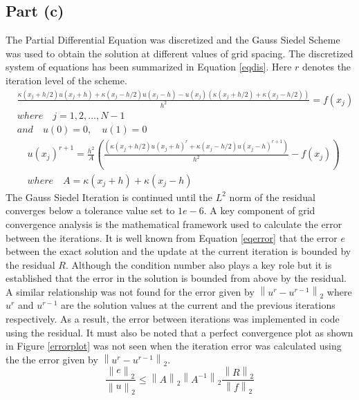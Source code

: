 \documentclass[12pt]{article}
\newcommand\norm[1]{\left\lVert#1\right\rVert}
\begin{document}
\subsection{Part (c)}
The Partial Differential Equation was discretized and the Gauss Siedel Scheme was used to obtain the solution at different values of grid spacing. The discretized system of equations has been summarized in Equation \ref{eqdis}. Here $r$ denotes the iteration level of the scheme.
\begin{equation} \label{eqdis}
    \begin{aligned}
        & \frac{\kappa( x_j + h/2 ) u(x_j + h) + \kappa( x_j - h/2 )u( x_j - h ) - u(x_j)( \kappa(x_j + h/2) + \kappa(x_j - h/2) )}{h^2} = f(x_j) \\
        & where \quad j = 1, 2, \ldots, N - 1 \\
        & and \quad u(0) = 0, \quad u(1) = 0
    \end{aligned}
\end{equation}
\begin{equation} \label{eqdis}
    \begin{aligned}
        & u(x_j)^{r + 1} = \frac{h^2}{A} \left( \frac{ \left( \kappa(x_j + h/2)u(x_j + h)^{r} + \kappa(x_j - h/2) u(x_j - h)^{r + 1} \right)}{h^2} - f(x_j) \right) \\
        & where \quad A = \kappa(x_j + h) + \kappa(x_j - h)
    \end{aligned}
\end{equation}
The Gauss Siedel Iteration is continued until the $L^2$ norm of the residual converges below a tolerance value set to $1e-6$. A key component of grid convergence analysis is the mathematical framework used to calculate the error between the iterations. It is well known from Equation \ref{eqerror} that the error $e$ between the exact solution and the update at the current iteration is bounded by the residual $R$. Although the condition number also plays a key role but it is established that the error in the solution is bounded from above by the residual. A similar relationship was not found for the error given by $\norm{u^{r} - u^{r - 1}}_2$ where $u^r$ and $u^{r - 1}$ are the solution values at the current and the previous iterations respectively. As a result, the error between iterations was implemented in code using the residual. It must also be noted that a perfect convergence plot as shown in Figure \ref{errorplot} was not seen when the iteration error was calculated using the the error given by $\norm{u^{r} - u^{r - 1}}_2$.
\begin{equation}\label{eqerror}
    \frac{\norm{e}_2}{\norm{u}_2} \leq \norm{A}_2 \norm{A^{-1}}_2 \frac{\norm{R}_2}{\norm{f}_2}
\end{equation}
\end{document}
